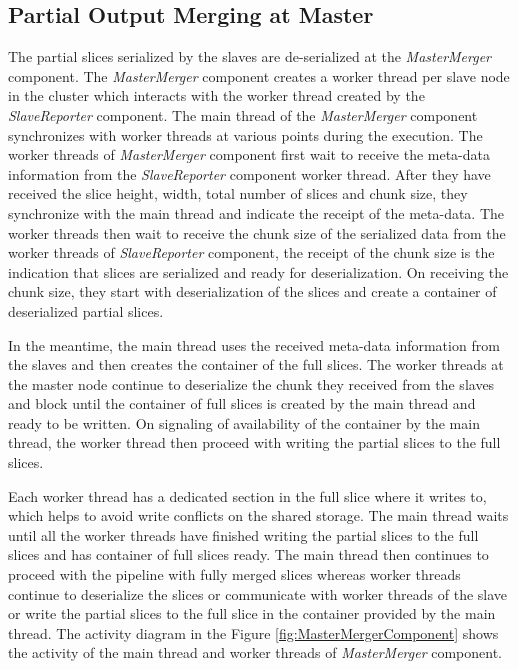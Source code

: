 \subsection{Partial Output Merging at Master} 

The partial slices serialized by the slaves are de-serialized at the \textit{MasterMerger} component. The \textit{MasterMerger} component creates a worker thread per slave node in the cluster which interacts with the worker thread created by the \textit{SlaveReporter} component. The main thread of the \textit{MasterMerger} component synchronizes with worker threads at various points during the execution. The worker threads of \textit{MasterMerger} component first wait to receive the meta-data information from the \textit{SlaveReporter} component worker thread. After they have received the slice height, width, total number of slices and chunk size, they synchronize with the main thread and indicate the receipt of the meta-data. The worker threads then wait to receive the chunk size of the serialized data from the worker threads of \textit{SlaveReporter} component, the receipt of the chunk size is the indication that slices are serialized and ready for deserialization. On receiving the chunk size, they start with deserialization of the slices and create a container of deserialized partial slices. \newline

In the meantime, the main thread uses the received meta-data information from the slaves and then creates the container of the full slices. The worker threads at the master node continue to deserialize the chunk they received from the slaves and block until the container of full slices is created by the main thread and ready to be written. On signaling of availability of the container by the main thread, the worker thread then proceed with writing the partial slices to the full slices.\newline 

Each worker thread has a dedicated section in the full slice where it writes to, which helps to avoid write conflicts on the shared storage. The main thread waits until all the worker threads have finished writing the partial slices to the full slices and has container of full slices ready. The main thread then continues to proceed with the pipeline with fully merged slices whereas worker threads continue to deserialize the slices or communicate with worker threads of the slave or write the partial slices to the full slice in the container provided by the main thread. The activity diagram in the Figure \ref{fig:MasterMergerComponent} shows the activity of the main thread and worker threads of \textit{MasterMerger} component. \newline
   
